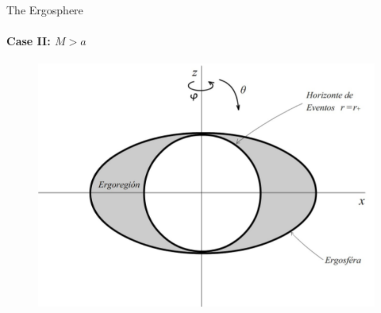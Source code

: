 \documentclass{beamer}
\begin{document}
        \begin{frame}{The Ergosphere}
         \framesubtitle{Case II: $M>a$}
        	\begin{center}
				\begin{figure}
				\includegraphics[scale=0.75] {figures/fig40.jpg}
				\end{figure}
			\end{center}	
        \end{frame}
  
\end{document}
